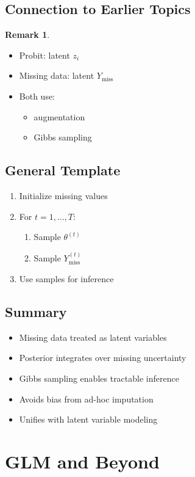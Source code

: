 \documentclass[12pt,oneside]{book}
\numberwithin{equation}{section}
\theoremstyle{definition}
\newtheorem{remark}{Remark}[section]
\theoremstyle{plain}
\theoremstyle{remark}
\begin{document}
\section{Connection to Earlier Topics}

\begin{remark}
\begin{itemize}
\item Probit: latent $z_i$
\item Missing data: latent $Y_{\text{miss}}$
\item Both use:
\begin{itemize}
\item augmentation
\item Gibbs sampling
\end{itemize}
\end{itemize}
\end{remark}

\section{General Template}

\begin{enumerate}
\item Initialize missing values
\item For $t = 1, \dots, T$:
\begin{enumerate}
\item Sample $\theta^{(t)}$
\item Sample $Y_{\text{miss}}^{(t)}$
\end{enumerate}
\item Use samples for inference
\end{enumerate}

\section{Summary}

\begin{itemize}
\item Missing data treated as latent variables
\item Posterior integrates over missing uncertainty
\item Gibbs sampling enables tractable inference
\item Avoids bias from ad-hoc imputation
\item Unifies with latent variable modeling
\end{itemize}

\chapter{GLM and Beyond}
\end{document}
